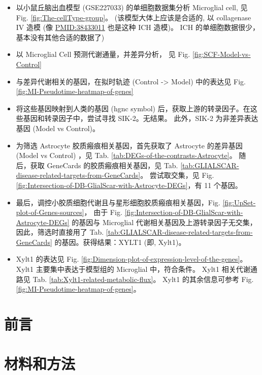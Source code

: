 \documentclass[
]{article}
\providecommand{\tightlist}{%
  \setlength{\itemsep}{0pt}\setlength{\parskip}{0pt}}
\begin{document}
\begin{itemize}
\tightlist
\item
  以小鼠丘脑出血模型 (GSE227033) 的单细胞数据集分析 Microglial cell, 见 Fig. \ref{fig:The-cellType-group}。
  (该模型大体上应该是合适的, 以 collagenase IV 造模 (像 \url{PMID:38433011} 也是这种 ICH 造模)。
  ICH 的单细胞数据很少，基本没有其他合适的数据了)
\item
  以 Microglial Cell 预测代谢通量，并差异分析， 见 Fig. \ref{fig:SCF-Model-vs-Control}
\item
  与差异代谢相关的基因，在拟时轨迹 (Control -\textgreater{} Model) 中的表达见 Fig. \ref{fig:MI-Pseudotime-heatmap-of-genes}
\item
  将这些基因映射到人类的基因 (hgnc symbol) 后，获取上游的转录因子。在这些基因和转录因子中，尝试寻找 SIK-2。无结果。
  此外，SIK-2 为非差异表达基因 (Model vs Control)。
\item
  为筛选 Astrocyte 胶质瘢痕相关基因，首先获取了 Astrocyte 的差异基因 (Model vs Control) ，见
  Tab. \ref{tab:DEGs-of-the-contrasts-Astrocyte}。
  随后，获取 GeneCards 的胶质瘢痕相关基因，见 Tab. \ref{tab:GLIALSCAR-disease-related-targets-from-GeneCards}。
  尝试取交集，见 Fig. \ref{fig:Intersection-of-DB-GlialScar-with-Astrocyte-DEGs}，有 11 个基因。
\item
  最后，调控小胶质细胞代谢且与星形细胞胶质瘢痕相关基因，Fig. \ref{fig:UpSet-plot-of-Genes-sources}，
  由于 Fig. \ref{fig:Intersection-of-DB-GlialScar-with-Astrocyte-DEGs} 的基因与 Microglial
  代谢相关基因及上游转录因子无交集，因此，筛选时直接用了 Tab. \ref{tab:GLIALSCAR-disease-related-targets-from-GeneCards}
  的基因。获得结果：XYLT1 (即, Xylt1)。
\item
  Xylt1 的表达见 Fig. \ref{fig:Dimension-plot-of-expression-level-of-the-genes}。
  Xylt1 主要集中表达于模型组的 Microglial 中，符合条件。
  Xylt1 相关代谢通路见 Tab. \ref{tab:Xylt1-related-metabolic-flux}。
  Xylt1 的其余信息可参考 Fig. \ref{fig:MI-Pseudotime-heatmap-of-genes}。
\end{itemize}

\hypertarget{introduction}{%
\section{前言}\label{introduction}}

\hypertarget{methods}{%
\section{材料和方法}\label{methods}}
\end{document}
